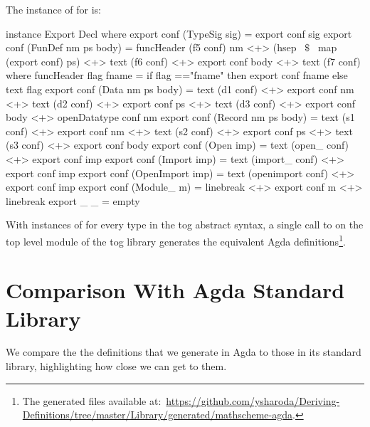 The instance of  for  is:  
\begin{hscode}
instance Export Decl where
  export conf (TypeSig sig) = export conf sig 
  export conf (FunDef nm ps body) =
    funcHeader (f5 conf) nm <+> (hsep ~$\$$~ map (export conf) ps) 
    <+> text (f6 conf) <+> export conf body <+> text (f7 conf)
    where funcHeader flag fname = 
            if flag =="fname" then export conf fname else text flag    
  export conf (Data nm ps body) =
    text (d1 conf) <+> export conf nm <+> text (d2 conf) 
    <+> export conf ps <+> text (d3 conf) <+> export conf body 
    <+> openDatatype conf nm
  export conf (Record nm ps body) =
    text (s1 conf) <+> export conf nm <+> text (s2 conf) 
    <+> export conf ps <+> text (s3 conf) <+> export conf body 
  export conf (Open imp) = text (open_ conf) <+> export conf imp
  export conf (Import imp) = text (import_ conf) <+> export conf imp
  export conf (OpenImport imp) = 
    text (openimport conf) <+> export conf imp
  export conf (Module_ m) =
    linebreak <+> export conf m  <+> linebreak 
  export _ _ = empty
\end{hscode}

With instances of  for every type in the tog abstract syntax, a single call to  on the top level module of the tog library generates the equivalent Agda definitions\footnote{The generated files available at:~\url{https://github.com/ysharoda/Deriving-Definitions/tree/master/Library/generated/mathscheme-agda}.}.

\section{Comparison With Agda Standard Library}
\label{sec:compasion_agda_stdlib}
We compare the the definitions that we generate in Agda to those in its standard library, highlighting how close we can get to them. 

